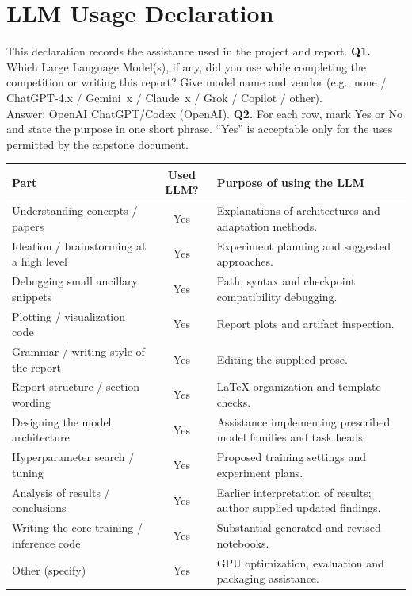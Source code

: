 \documentclass[11pt, oneside]{article}
\begin{document}
\clearpage
\section*{LLM Usage Declaration}
This declaration records the assistance used in the project and report.
\medskip
\noindent
\textbf{Q1.} Which Large Language Model(s), if any, did you use while completing the competition or writing this report? Give model name and vendor (e.g., none / ChatGPT-4.x / Gemini~x / Claude~x / Grok / Copilot / other). \\[0.6em]
Answer: OpenAI ChatGPT/Codex (OpenAI).
\medskip
\noindent
\textbf{Q2.} For each row, mark Yes or No and state the purpose in one short phrase. ``Yes'' is acceptable only for the uses permitted by the capstone document.
\begin{table}[H]
\centering
\begin{tabular}{>{\raggedright\arraybackslash}p{4.6cm}|c|>{\raggedright\arraybackslash}p{7.2cm}}
\toprule
Part & Used LLM? & Purpose of using the LLM \\
\midrule
Understanding concepts / papers & Yes & Explanations of architectures and adaptation methods. \\
Ideation / brainstorming at a high level & Yes & Experiment planning and suggested approaches. \\
Debugging small ancillary snippets & Yes & Path, syntax and checkpoint compatibility debugging. \\
Plotting / visualization code & Yes & Report plots and artifact inspection. \\
Grammar / writing style of the report & Yes & Editing the supplied prose. \\
Report structure / section wording & Yes & LaTeX organization and template checks. \\
Designing the model architecture & Yes & Assistance implementing prescribed model families and task heads. \\
Hyperparameter search / tuning & Yes & Proposed training settings and experiment plans. \\
Analysis of results / conclusions & Yes & Earlier interpretation of results; author supplied updated findings. \\
Writing the core training / inference code & Yes & Substantial generated and revised notebooks. \\
Other (specify) & Yes & GPU optimization, evaluation and packaging assistance. \\
\bottomrule
\end{tabular}
\end{table}
\end{document}
